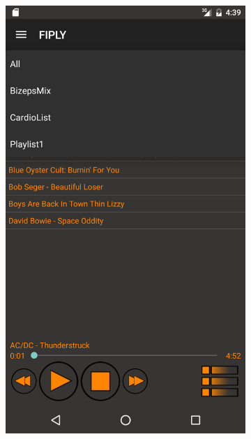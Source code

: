 \documentclass[FIPLY_base.tex]{subfiles}
\begin{document}
\begin{figure}[h]
	\begin{subfigure}[b]{0.3\textwidth}
	\includegraphics[scale=0.17]{img/musicListenView1}
	\end{subfigure}
	\hfil
	\begin{subfigure}[b]{0.3\textwidth}

\end{subfigure}
\end{figure}
\end{document}
